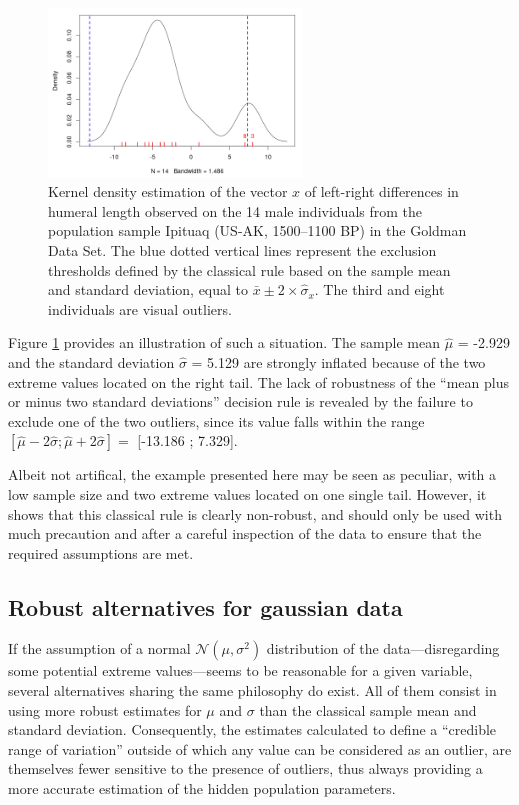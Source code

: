 \documentclass[review, 3p]{elsarticle}
\begin{document}
\begin{figure}[htbp]
\centering
\includegraphics[width=0.6\textwidth]{figures/failure2sd.png}
\caption{\label{fig:org403d450}Kernel density estimation of the vector \(x\) of left-right differences in humeral length observed on the 14 male individuals from the population sample Ipituaq (US-AK, 1500--1100 BP) in the Goldman Data Set. The blue dotted vertical lines represent the exclusion thresholds defined by the classical rule based on the sample mean and standard deviation, equal to \(\bar{x} \pm 2 \times \hat{\sigma}_x\). The third and eight individuals are visual outliers.}
\end{figure}

Figure \ref{fig:org403d450} provides an illustration of such a situation. The sample mean \(\hat{\mu}\) = -2.929 and the standard deviation \(\hat{\sigma}\) = 5.129 are strongly inflated because of the two extreme values located on the right tail. The lack of robustness of the ``mean plus or minus two standard deviations'' decision rule is revealed by the failure to exclude one of the two outliers, since its value falls within the range \([\hat{\mu} - 2 \hat{\sigma}; \hat{\mu} + 2 \hat{\sigma}] =\) [-13.186 ; 7.329].

Albeit not artifical, the example presented here may be seen as peculiar, with a low sample size and two extreme values located on one single tail. However, it shows that this classical rule is clearly non-robust, and should only be used with much precaution and after a careful inspection of the data to ensure that the required assumptions are met.

\subsection{Robust alternatives for gaussian data}
\label{sec:orgca31c46}
If the assumption of a normal \(\mathcal{N}(\mu, \sigma^2)\) distribution of the data---disregarding some potential extreme values---seems to be reasonable for a given variable, several alternatives sharing the same philosophy do exist. All of them consist in using more robust estimates for \(\mu\) and \(\sigma\) than the classical sample mean and standard deviation. Consequently, the estimates calculated to define a ``credible range of variation'' outside of which any value can be considered as an outlier, are themselves fewer sensitive to the presence of outliers, thus always providing a more accurate estimation of the hidden population parameters.
\end{document}
